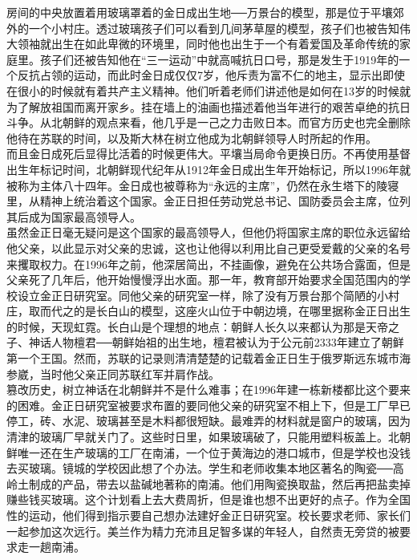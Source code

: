 房间的中央放置着用玻璃罩着的金日成出生地──万景台的模型，那是位于平壤郊外的一个小村庄。透过玻璃孩子们可以看到几间茅草屋的模型，孩子们也被告知伟大领袖就出生在如此卑微的环境里，同时他也出生于一个有着爱国及革命传统的家庭里。孩子们还被告知他在“三一运动”中就高喊抗日口号，那是发生于1919年的一个反抗占领的运动，而此时金日成仅仅7岁，他斥责为富不仁的地主，显示出即使在很小的时候就有着共产主义精神。他们听着老师们讲述他是如何在13岁的时候就为了解放祖国而离开家乡。挂在墙上的油画也描述着他当年进行的艰苦卓绝的抗日斗争。从北朝鲜的观点来看，他几乎是一己之力击败日本。而官方历史也完全删除他待在苏联的时间，以及斯大林在树立他成为北朝鲜领导人时所起的作用。\\

而且金日成死后显得比活着的时候更伟大。平壤当局命令更换日历。不再使用基督出生年标记时间，北朝鲜现代纪年从1912年金日成出生年开始标记，所以1996年就被称为主体八十四年。金日成也被尊称为“永远的主席”，仍然在永生塔下的陵寝里，从精神上统治着这个国家。金正日担任劳动党总书记、国防委员会主席，位列其后成为国家最高领导人。\\

虽然金正日毫无疑问是这个国家的最高领导人，但他仍将国家主席的职位永远留给他父亲，以此显示对父亲的忠诚，这也让他得以利用比自己更受爱戴的父亲的名号来攫取权力。在1996年之前，他深居简出，不挂画像，避免在公共场合露面，但是父亲死了几年后，他开始慢慢浮出水面。那一年，教育部开始要求全国范围内的学校设立金正日研究室。同他父亲的研究室一样，除了没有万景台那个简陋的小村庄，取而代之的是长白山的模型，这座火山位于中朝边境，在哪里据称金正日出生的时候，天现虹霓。长白山是个理想的地点：朝鲜人长久以来都认为那是天帝之子、神话人物檀君──朝鲜始祖的出生地，檀君被认为于公元前2333年建立了朝鲜第一个王国。然而，苏联的记录则清清楚楚的记载着金正日生于俄罗斯远东城市海参崴，当时他父亲正同苏联红军并肩作战。\\

篡改历史，树立神话在北朝鲜并不是什么难事；在1996年建一栋新楼都比这个要来的困难。金正日研究室被要求布置的要同他父亲的研究室不相上下，但是工厂早已停工，砖、水泥、玻璃甚至是木料都很短缺。最难弄的材料就是窗户的玻璃，因为清津的玻璃厂早就关门了。这些时日里，如果玻璃破了，只能用塑料板盖上。北朝鲜唯一还在生产玻璃的工厂在南浦，一个位于黄海边的港口城市，但是学校也没钱去买玻璃。镜城的学校因此想了个办法。学生和老师收集本地区著名的陶瓷──高岭土制成的产品，带去以盐碱地著称的南浦。他们用陶瓷换取盐，然后再把盐卖掉赚些钱买玻璃。这个计划看上去大费周折，但是谁也想不出更好的点子。作为全国性的运动，他们得到指示要自己想办法建好金正日研究室。校长要求老师、家长们一起参加这次远行。美兰作为精力充沛且足智多谋的年轻人，自然责无旁贷的被要求走一趟南浦。\\

